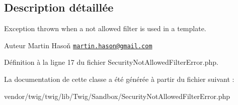 \subsection{Description détaillée}
Exception thrown when a not allowed filter is used in a template.

\begin{DoxyAuthor}{Auteur}
Martin Hasoň \href{mailto:martin.hason@gmail.com}{\tt martin.\+hason@gmail.\+com} 
\end{DoxyAuthor}


Définition à la ligne 17 du fichier Security\+Not\+Allowed\+Filter\+Error.\+php.



La documentation de cette classe a été générée à partir du fichier suivant \+:\begin{DoxyCompactItemize}
\item 
vendor/twig/twig/lib/\+Twig/\+Sandbox/Security\+Not\+Allowed\+Filter\+Error.\+php\end{DoxyCompactItemize}
